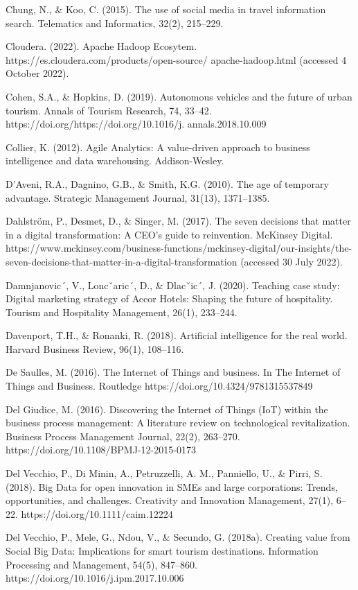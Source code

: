\documentclass[
  letterpaper,
  DIV=11,
  numbers=noendperiod]{scrreprt}
\begin{document}
Chung, N., \& Koo, C. (2015). The use of social media in travel
information search. Telematics and Informatics, 32(2), 215--229.

Cloudera. (2022). Apache Hadoop Ecosytem.
https://es.cloudera.com/products/open-source/ apache-hadoop.html
(accessed 4 October 2022).

Cohen, S.A., \& Hopkins, D. (2019). Autonomous vehicles and the future
of urban tourism. Annals of Tourism Research, 74, 33--42.
https://doi.org/https://doi.org/10.1016/j. annals.2018.10.009

Collier, K. (2012). Agile Analytics: A value-driven approach to business
intelligence and data warehousing. Addison-Wesley.

D'Aveni, R.A., Dagnino, G.B., \& Smith, K.G. (2010). The age of
temporary advantage. Strategic Management Journal, 31(13), 1371--1385.

Dahlström, P., Desmet, D., \& Singer, M. (2017). The seven decisions
that matter in a digital transformation: A CEO's guide to reinvention.
McKinsey Digital.
https://www.mckinsey.com/business-functions/mckinsey-digital/our-insights/the-seven-decisions-that-matter-in-a-digital-transformation
(accessed 30 July 2022).

Damnjanovic´, V., Loncˇaric´, D., \& Dlacˇic´, J. (2020). Teaching case
study: Digital marketing strategy of Accor Hotels: Shaping the future of
hospitality. Tourism and Hospitality Management, 26(1), 233--244.

Davenport, T.H., \& Ronanki, R. (2018). Artificial intelligence for the
real world. Harvard Business Review, 96(1), 108--116.

De Saulles, M. (2016). The Internet of Things and business. In The
Internet of Things and Business. Routledge
https://doi.org/10.4324/9781315537849

Del Giudice, M. (2016). Discovering the Internet of Things (IoT) within
the business process management: A literature review on technological
revitalization. Business Process Management Journal, 22(2), 263--270.
https://doi.org/10.1108/BPMJ-12-2015-0173

Del Vecchio, P., Di Minin, A., Petruzzelli, A. M., Panniello, U., \&
Pirri, S. (2018). Big Data for open innovation in SMEs and large
corporations: Trends, opportunities, and challenges. Creativity and
Innovation Management, 27(1), 6--22. https://doi.org/10.1111/caim.12224

Del Vecchio, P., Mele, G., Ndou, V., \& Secundo, G. (2018a). Creating
value from Social Big Data: Implications for smart tourism destinations.
Information Processing and Management, 54(5), 847--860.
https://doi.org/10.1016/j.ipm.2017.10.006
\end{document}
